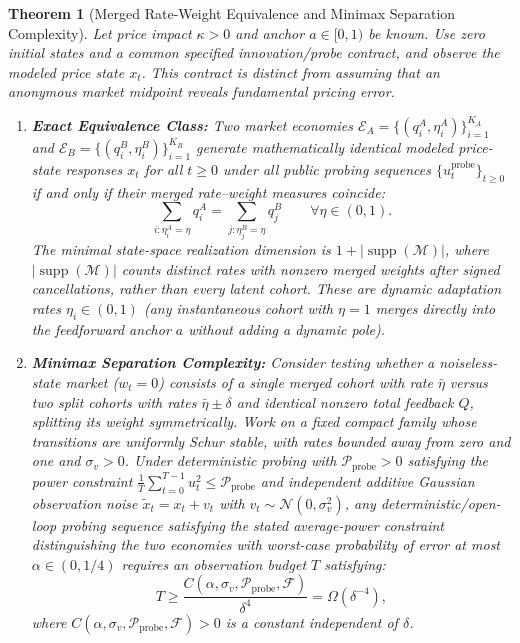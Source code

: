 \documentclass[12pt]{article}
\newtheorem{theorem}{Theorem}[section]
\theoremstyle{definition}
\theoremstyle{remark}
\begin{document}
\begin{theorem}[Merged Rate-Weight Equivalence and Minimax Separation Complexity]
\label{thm:m1_equivalence}\label{thm:m2_sample_complexity}
Let price impact $\kappa > 0$ and anchor $a \in [0, 1)$ be known. Use zero initial states and a common specified innovation/probe contract, and observe the modeled price state $x_t$. This contract is distinct from assuming that an anonymous market midpoint reveals fundamental pricing error.
\begin{enumerate}
    \item \textbf{Exact Equivalence Class:} Two market economies $\mathcal{E}_A = \{(q_i^A, \eta_i^A)\}_{i=1}^{K_A}$ and $\mathcal{E}_B = \{(q_i^B, \eta_i^B)\}_{i=1}^{K_B}$ generate mathematically identical modeled price-state responses $x_t$ for all $t \ge 0$ under all public probing sequences $\{u_t^{\text{probe}}\}_{t \ge 0}$ if and only if their merged rate--weight measures coincide:
    \begin{equation}
    \sum_{i: \eta_i^A = \eta} q_i^A = \sum_{j: \eta_j^B = \eta} q_j^B \qquad \forall \eta \in (0, 1).
    \label{eq:merged_measure}
    \end{equation}
    The minimal state-space realization dimension is $1 + |\operatorname{supp}(\mathcal{M})|$, where $|\operatorname{supp}(\mathcal{M})|$ counts distinct rates with nonzero merged weights after signed cancellations, rather than every latent cohort. These are dynamic adaptation rates $\eta_i \in (0, 1)$ (any instantaneous cohort with $\eta = 1$ merges directly into the feedforward anchor $a$ without adding a dynamic pole).
    \item \textbf{Minimax Separation Complexity:} Consider testing whether a noiseless-state market ($w_t = 0$) consists of a single merged cohort with rate $\bar{\eta}$ versus two split cohorts with rates $\bar{\eta} \pm \delta$ and identical nonzero total feedback $Q$, splitting its weight symmetrically. Work on a fixed compact family whose transitions are uniformly Schur stable, with rates bounded away from zero and one and $\sigma_v>0$. Under deterministic probing with $\mathcal P_{\text{probe}}>0$ satisfying the power constraint $\frac{1}{T} \sum_{t=0}^{T-1} u_t^2 \le \mathcal{P}_{\text{probe}}$ and independent additive Gaussian observation noise $\tilde{x}_t = x_t + v_t$ with $v_t \sim \mathcal{N}(0, \sigma_v^2)$, any deterministic/open-loop probing sequence satisfying the stated average-power constraint distinguishing the two economies with worst-case probability of error at most $\alpha \in (0, 1/4)$ requires an observation budget $T$ satisfying:
    \begin{equation}
    T \ge \frac{C(\alpha, \sigma_v, \mathcal{P}_{\text{probe}},\mathcal F)}{\delta^4} = \Omega(\delta^{-4}),
    \label{eq:delta_fourth}
    \end{equation}
    where $C(\alpha, \sigma_v, \mathcal{P}_{\text{probe}},\mathcal F) > 0$ is a constant independent of $\delta$.
\end{enumerate}
\end{theorem}
\end{document}
